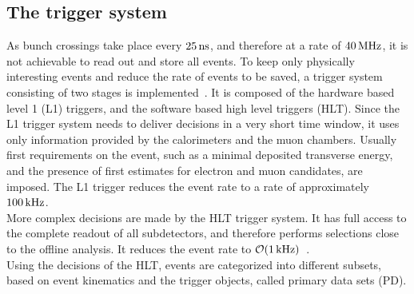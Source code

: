 \subsection{The trigger system}
As bunch crossings take place every $25\,\text{ns}$, and therefore at a rate of $40\,\text{MHz}$, it is not achievable to read out and store all events. To keep only physically interesting events and reduce the rate of events to be saved, a trigger system consisting of two stages is implemented~\cite{TriggerSystem}. It is composed of the hardware based level 1 (L1) triggers, and the software based high level triggers (HLT). Since the L1 trigger system needs to deliver decisions in a very short time window, it uses only information provided by the calorimeters and the muon chambers. Usually first requirements on the event, such as a minimal deposited transverse energy, and the presence of first estimates for electron and muon candidates, are imposed. The L1 trigger reduces the event rate to a rate of approximately $100\,\text{kHz}$.\\
More complex decisions are made by the HLT trigger system. It has full access to the complete readout of all subdetectors, and therefore performs selections close to the offline analysis. It reduces the event rate to $\mathcal{O}(1\,\text{kHz})$~\cite{TriggerRate}.\\
Using the decisions of the HLT, events are categorized into different subsets, based on event kinematics and the trigger objects, called primary data sets (PD).
